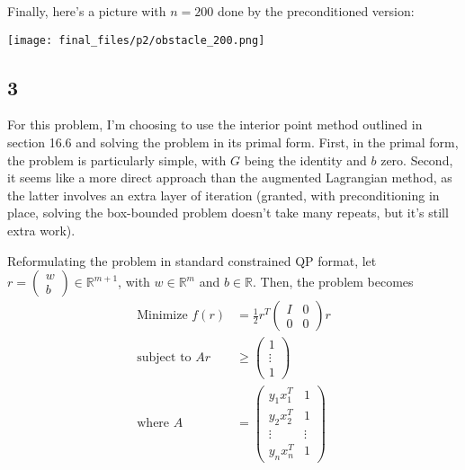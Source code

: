 \documentclass{article}
\newcommand{\openm}{\begin{pmatrix}}
\newcommand{\closem}{\end{pmatrix}}
\newcommand{\rn}{\mathbb{R}}
\begin{document}
Finally, here's a picture with $n=200$ done by the preconditioned version:

\texttt{[image: final\_files/p2/obstacle\_200.png]}
\subsection*{3}
For this problem, I'm choosing to use the interior point method outlined in section 16.6 and solving the problem in its primal form. First, in the primal form, the problem is particularly simple, with $G$ being the identity and $b$ zero. Second, it seems like a more direct approach than the augmented Lagrangian method, as the latter involves an extra layer of iteration (granted, with preconditioning in place, solving the box-bounded problem doesn't take many repeats, but it's still extra work). 

Reformulating the problem in standard constrained QP format, let $r=\openm w\\b\closem\in\rn^{m+1}$, with $w\in\rn^m$ and $b\in\rn$. Then, the problem becomes 
\begin{align*}
    \text{Minimize }f(r)&=\frac{1}{2}r^T\openm I&0\\0&0\closem r\\
    \text{subject to }Ar&\geq\openm 1\\\vdots\\1\closem\\
    \text{where }A&=\openm y_1x_1^T&1\\y_2x_2^T&1\\\vdots&\vdots\\y_nx_n^T&1\closem\\
\end{align*}
\end{document}
